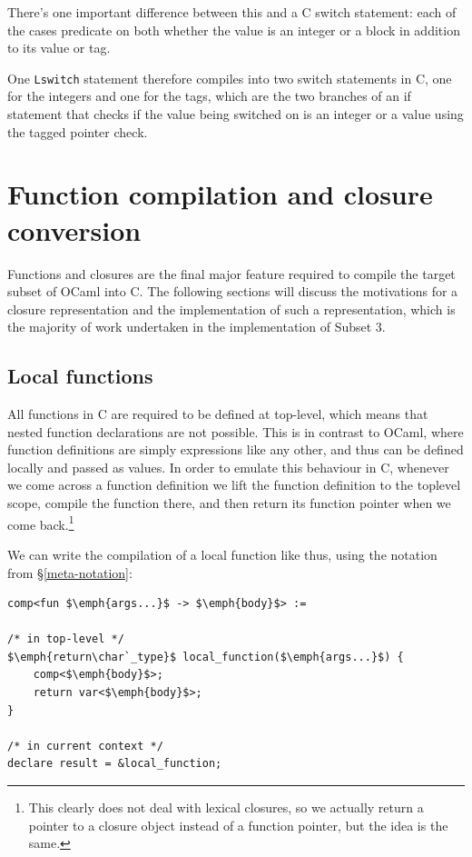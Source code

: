 There's one important difference between this and a C switch statement: each of
the cases predicate on both whether the value is an integer or a block in
addition to its value or tag.

One \texttt{Lswitch} statement therefore compiles into two switch statements in
C, one for the integers and one for the tags, which are the two branches of an
if statement that checks if the value being switched on is an integer or a value
using the tagged pointer check.

\section{Function compilation and closure conversion} \label{functions}

Functions and closures are the final major feature required to compile the
target subset of OCaml into C. The following sections will discuss the
motivations for a closure representation and the implementation of such a
representation, which is the majority of work undertaken in the implementation
of Subset 3.

\subsection{Local functions}

All functions in C are required to be defined at top-level, which means that 
nested function declarations are not possible. This is in contrast to OCaml, 
where function definitions are simply expressions like any other, and thus can 
be defined locally and passed as values. In order to emulate this behaviour in 
C, whenever we come across a function definition we lift the function 
definition to the toplevel scope, compile the function there, and then return 
its function pointer when we come back.\footnote{This clearly does not deal 
with lexical closures, so we actually return a pointer to a closure object 
instead of a function pointer, but the idea is the same.}

We can write the compilation of a local function like thus, using the notation
from \S\ref{meta-notation}:

\begin{lstlisting}
comp<fun $\emph{args...}$ -> $\emph{body}$> :=

/* in top-level */
$\emph{return\char`_type}$ local_function($\emph{args...}$) {
    comp<$\emph{body}$>;
    return var<$\emph{body}$>;
}

/* in current context */
declare result = &local_function;
\end{lstlisting}

